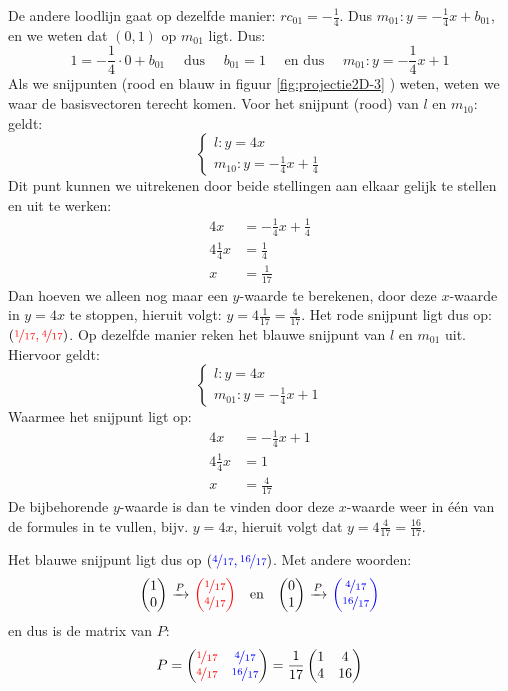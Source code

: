 De andere loodlijn gaat op dezelfde manier: $rc_{01}= -\frac{1}{4}$. Dus $m_{01}: y=-\frac{1}{4}x + b_{01}$, en we weten dat $(0,1)$ op $m_{01}$ ligt. Dus: \[1=-\frac{1}{4}\cdot 0 + b_{01} \quad \text{ dus } \quad b_{01} = 1 \quad \text{ en dus } \quad m_{01}: y=-\frac{1}{4}x+1\] Als we snijpunten (rood en blauw in figuur \ref{fig:projectie2D-3} ) weten, weten we waar de basisvectoren terecht komen. Voor het snijpunt (rood) van  $l$ en $m_{10}:$ geldt:
\[
    \begin{cases}
        l: y=4x \\
        m_{10}: y =-\frac{1}{4}x + \frac{1}{4}
    \end{cases}
\] 
Dit punt kunnen we uitrekenen door beide stellingen aan elkaar gelijk te stellen en uit te werken:
\begin{align*}
    4x &=-\frac{1}{4}x + \frac{1}{4} \\
    4\frac{1}{4}x &= \frac{1}{4} \\
    x &= \frac{1}{17}
\end{align*}
Dan hoeven we alleen nog maar een $y$-waarde te berekenen, door deze $x$-waarde in $y=4x$ te stoppen, hieruit volgt: $y=4\frac{1}{17}=\frac{4}{17}$. Het rode snijpunt ligt dus op: $({\color{red}\nicefrac{1}{17},\nicefrac{4}{17}})$.
Op dezelfde manier reken het blauwe snijpunt van  $l$ en $ m_{01}$ uit. Hiervoor geldt:
\[
    \begin{cases}
        l: y=4x \\
        m_{01}: y=-\frac{1}{4}x+1
    \end{cases}
\] 
Waarmee het snijpunt ligt op:
\begin{align*}
    4x &= -\frac{1}{4}x + 1 \\
    4\frac{1}{4}x &= 1 \\
    x &= \frac{4}{17}
\end{align*}
De bijbehorende $y$-waarde is dan te vinden door deze $x$-waarde weer in één van de formules in te vullen, bijv. $y=4x$, hieruit volgt dat $y=4\frac{4}{17}=\frac{16}{17}$.

Het blauwe snijpunt ligt dus op $({\color{blue}\nicefrac{4}{17},\nicefrac{16}{17}})$. Met andere woorden:
\[ 
    \vectwee{1}{0}\ \xrightarrow{P}\ \vectwee[red]{\nicefrac{1}{17}}{\nicefrac{4}{17}} \quad \text{en} \quad 
    \vectwee{0}{1}\ \xrightarrow{P}\ \vectwee[blue]{\nicefrac{4}{17}}{\nicefrac{16}{17}}
\]
en dus is de matrix van $P$:
\[
    P = \begin{pmatrix} {\color{red}\nicefrac{1}{17}}&{\color{blue}\nicefrac{4}{17}} \\ {\color{red}\nicefrac{4}{17}}&{\color{blue}\nicefrac{16}{17}} \end{pmatrix} = \frac{1}{17}\begin{pmatrix} 1&4 \\ 4&16 \end{pmatrix}
\]

